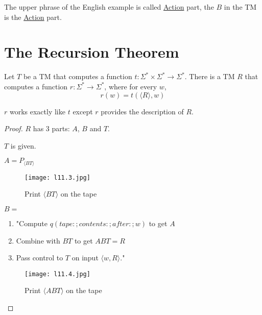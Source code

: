 The upper phrase of the English example is called \underline{Action} part, the \(B\) in the TM is the \underline{Action} part. 

\section{The Recursion Theorem}

\begin{theorem}
    Let \(T\) be a TM that computes a function \(t: \Sigma^* \times \Sigma^* \rightarrow \Sigma^*\). 
    There is a TM \(R\) that computes a function \(r:\Sigma^* \rightarrow \Sigma^*\), where for every \(w\),
    \[
        r(w) = t(\langle R \rangle, w)
    \]   
    \begin{remark}
        \(r\) works exactly like \(t\) except \(r\) provides the description of \(R\).    
    \end{remark}
\end{theorem}
\begin{proof}
    \(R\) has 3 parts: \(A\), \(B\) and \(T\).

    \(T\) is given. 

    \(A = P_{\langle BT \rangle}\) 

    \begin{figure}[H]
        \centering
        \texttt{[image: l11.3.jpg]}
        \caption{Print \(\langle BT \rangle\) on the tape}
    \end{figure}

    \(B = \) \begin{enumerate}
        \item "Compute \(q(tape :; contents :; after:; w)\) to get \(A\)
        \item Combine with \(BT\) to get \(ABT = R\)
        \item Pass control to \(T\) on input \(\langle w, R \rangle\)."      
    \end{enumerate} 

    \begin{figure}[H]
        \centering
        \texttt{[image: l11.4.jpg]}
        \caption{Print \(\langle ABT \rangle\) on the tape}
    \end{figure}
\end{proof}

